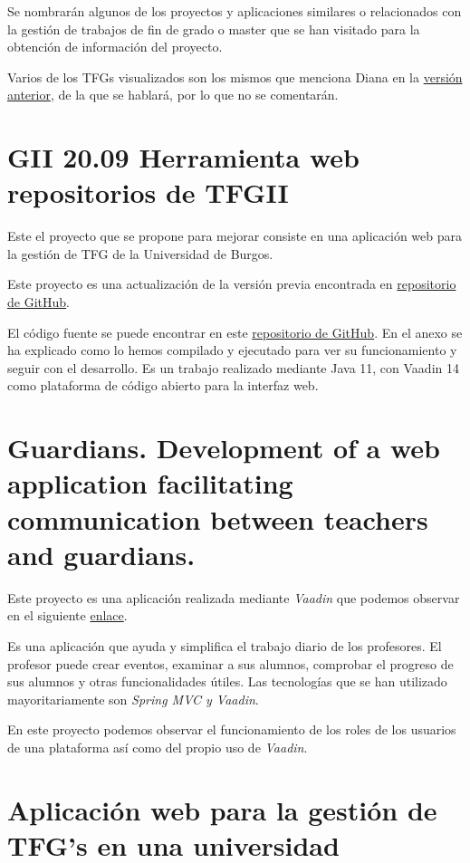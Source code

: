 Se nombrarán algunos de los proyectos y aplicaciones similares o relacionados con la gestión de trabajos de fin de grado o master que se han visitado para la obtención de información del proyecto.

Varios de los TFGs visualizados son los mismos que menciona Diana en la \href{https://github.com/dbo1001/Gestor-TFG-2021}{versión anterior}, de la que se hablará, por lo que no se comentarán.  

\section{GII 20.09 Herramienta web repositorios de TFGII}
Este el proyecto que se propone para mejorar consiste en una aplicación web para la gestión de TFG de la Universidad de Burgos.

Este proyecto es una actualización de la versión previa encontrada en \href{https://github.com/jfb0019/Gestor-TFG-2016}{repositorio de GitHub}. 

El código fuente se puede encontrar en este \href{https://github.com/dbo1001/Gestor-TFG-2021}{repositorio de GitHub}. En el anexo se ha explicado como lo hemos compilado y ejecutado para ver su funcionamiento y seguir con el desarrollo. Es un trabajo realizado mediante Java 11, con Vaadin 14 como plataforma de código abierto para la interfaz web. 

\section{Guardians. Development of a web application facilitating communication between teachers and guardians.}

Este proyecto es una aplicación realizada mediante \emph{Vaadin} que podemos observar en el siguiente \href{https://github.com/david-romero/tfg-vaadin}{enlace}.

Es una aplicación que ayuda y simplifica el trabajo diario de los profesores. El profesor puede crear eventos, examinar a sus alumnos, comprobar el progreso de sus alumnos y otras funcionalidades útiles. Las tecnologías que se han utilizado mayoritariamente son \emph{Spring MVC y Vaadin}.

En este proyecto podemos observar el funcionamiento de los roles de los usuarios de una plataforma así como del propio uso de \emph{Vaadin}.

\section{Aplicación web para la gestión de TFG's en una universidad}

